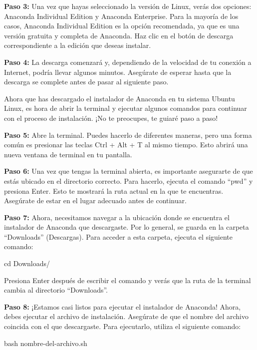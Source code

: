\documentclass[
  letterpaper,
  DIV=11,
  numbers=noendperiod]{scrartcl}
\newenvironment{Shaded}{}{}
\newcommand{\BuiltInTok}[1]{\textcolor[rgb]{0.84,0.23,0.29}{#1}}
\newcommand{\FunctionTok}[1]{\textcolor[rgb]{0.44,0.26,0.76}{#1}}
\newcommand{\NormalTok}[1]{\textcolor[rgb]{0.14,0.16,0.18}{#1}}
\begin{document}
\textbf{Paso 3:} Una vez que hayas seleccionado la versión de Linux,
verás dos opciones: Anaconda Individual Edition y Anaconda Enterprise.
Para la mayoría de los casos, Anaconda Individual Edition es la opción
recomendada, ya que es una versión gratuita y completa de Anaconda. Haz
clic en el botón de descarga correspondiente a la edición que deseas
instalar.

\textbf{Paso 4:} La descarga comenzará y, dependiendo de la velocidad de
tu conexión a Internet, podría llevar algunos minutos. Asegúrate de
esperar hasta que la descarga se complete antes de pasar al siguiente
paso.

Ahora que has descargado el instalador de Anaconda en tu sistema Ubuntu
Linux, es hora de abrir la terminal y ejecutar algunos comandos para
continuar con el proceso de instalación. ¡No te preocupes, te guiaré
paso a paso!

\textbf{Paso 5:} Abre la terminal. Puedes hacerlo de diferentes maneras,
pero una forma común es presionar las teclas Ctrl + Alt + T al mismo
tiempo. Esto abrirá una nueva ventana de terminal en tu pantalla.

\textbf{Paso 6:} Una vez que tengas la terminal abierta, es importante
asegurarte de que estás ubicado en el directorio correcto. Para hacerlo,
ejecuta el comando ``pwd'' y presiona Enter. Esto te mostrará la ruta
actual en la que te encuentras. Asegúrate de estar en el lugar adecuado
antes de continuar.

\textbf{Paso 7:} Ahora, necesitamos navegar a la ubicación donde se
encuentra el instalador de Anaconda que descargaste. Por lo general, se
guarda en la carpeta ``Downloads'' (Descargas). Para acceder a esta
carpeta, ejecuta el siguiente comando:

\begin{Shaded}
\begin{Highlighting}[]
\BuiltInTok{cd}\NormalTok{ Downloads/}
\end{Highlighting}
\end{Shaded}

Presiona Enter después de escribir el comando y verás que la ruta de la
terminal cambia al directorio ``Downloads''.

\textbf{Paso 8:} ¡Estamos casi listos para ejecutar el instalador de
Anaconda! Ahora, debes ejecutar el archivo de instalación. Asegúrate de
que el nombre del archivo coincida con el que descargaste. Para
ejecutarlo, utiliza el siguiente comando:

\begin{Shaded}
\begin{Highlighting}[]
\FunctionTok{bash}\NormalTok{ nombre{-}del{-}archivo.sh}
\end{Highlighting}
\end{Shaded}
\end{document}
